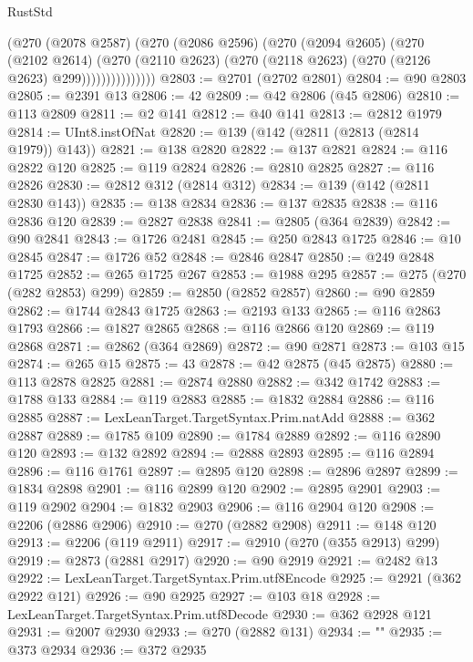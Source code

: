 \begin{lexlean}{RustStd}
\begin{coremodule}
                    (@270
                      (@2078 @2587)
                      (@270
                        (@2086 @2596)
                        (@270
                          (@2094 @2605)
                          (@270
                            (@2102 @2614)
                            (@270
                              (@2110 @2623)
                              (@270 (@2118 @2623) (@270 (@2126 @2623) @299)))))))))))))))
@2803 := @2701 (@2702 @2801)
@2804 := @90 @2803
@2805 := @2391 @13
@2806 := 42
@2809 := @42 @2806 (@45 @2806)
@2810 := @113 @2809
@2811 := @2 @141
@2812 := @40 @141
@2813 := @2812 @1979
@2814 := UInt8.instOfNat
@2820 := @139 (@142 (@2811 (@2813 (@2814 @1979)) @143))
@2821 := @138 @2820
@2822 := @137 @2821
@2824 := @116 @2822 @120
@2825 := @119 @2824
@2826 := @2810 @2825
@2827 := @116 @2826
@2830 := @2812 @312 (@2814 @312)
@2834 := @139 (@142 (@2811 @2830 @143))
@2835 := @138 @2834
@2836 := @137 @2835
@2838 := @116 @2836 @120
@2839 := @2827 @2838
@2841 := @2805 (@364 @2839)
@2842 := @90 @2841
@2843 := @1726 @2481
@2845 := @250 @2843 @1725
@2846 := @10 @2845
@2847 := @1726 @52
@2848 := @2846 @2847
@2850 := @249 @2848 @1725
@2852 := @265 @1725 @267
@2853 := @1988 @295
@2857 := @275 (@270 (@282 @2853) @299)
@2859 := @2850 (@2852 @2857)
@2860 := @90 @2859
@2862 := @1744 @2843 @1725
@2863 := @2193 @133
@2865 := @116 @2863 @1793
@2866 := @1827 @2865
@2868 := @116 @2866 @120
@2869 := @119 @2868
@2871 := @2862 (@364 @2869)
@2872 := @90 @2871
@2873 := @103 @15
@2874 := @265 @15
@2875 := 43
@2878 := @42 @2875 (@45 @2875)
@2880 := @113 @2878 @2825
@2881 := @2874 @2880
@2882 := @342 @1742
@2883 := @1788 @133
@2884 := @119 @2883
@2885 := @1832 @2884
@2886 := @116 @2885
@2887 := LexLeanTarget.TargetSyntax.Prim.natAdd
@2888 := @362 @2887
@2889 := @1785 @109
@2890 := @1784 @2889
@2892 := @116 @2890 @120
@2893 := @132 @2892
@2894 := @2888 @2893
@2895 := @116 @2894
@2896 := @116 @1761
@2897 := @2895 @120
@2898 := @2896 @2897
@2899 := @1834 @2898
@2901 := @116 @2899 @120
@2902 := @2895 @2901
@2903 := @119 @2902
@2904 := @1832 @2903
@2906 := @116 @2904 @120
@2908 := @2206 (@2886 @2906)
@2910 := @270 (@2882 @2908)
@2911 := @148 @120
@2913 := @2206 (@119 @2911)
@2917 := @2910 (@270 (@355 @2913) @299)
@2919 := @2873 (@2881 @2917)
@2920 := @90 @2919
@2921 := @2482 @13
@2922 := LexLeanTarget.TargetSyntax.Prim.utf8Encode
@2925 := @2921 (@362 @2922 @121)
@2926 := @90 @2925
@2927 := @103 @18
@2928 := LexLeanTarget.TargetSyntax.Prim.utf8Decode
@2930 := @362 @2928 @121
@2931 := @2007 @2930
@2933 := @270 (@2882 @131)
@2934 := ""
@2935 := @373 @2934
@2936 := @372 @2935

\end{coremodule}
\end{lexlean}

